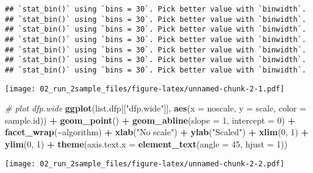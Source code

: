 \documentclass[
]{article}
\newenvironment{Shaded}{\begin{snugshade}}{\end{snugshade}}
\newcommand{\AttributeTok}[1]{\textcolor[rgb]{0.13,0.29,0.53}{#1}}
\newcommand{\CommentTok}[1]{\textcolor[rgb]{0.56,0.35,0.01}{\textit{#1}}}
\newcommand{\DecValTok}[1]{\textcolor[rgb]{0.00,0.00,0.81}{#1}}
\newcommand{\FunctionTok}[1]{\textcolor[rgb]{0.13,0.29,0.53}{\textbf{#1}}}
\newcommand{\NormalTok}[1]{#1}
\newcommand{\SpecialCharTok}[1]{\textcolor[rgb]{0.81,0.36,0.00}{\textbf{#1}}}
\newcommand{\StringTok}[1]{\textcolor[rgb]{0.31,0.60,0.02}{#1}}
\begin{document}
\begin{verbatim}
## `stat_bin()` using `bins = 30`. Pick better value with `binwidth`.
## `stat_bin()` using `bins = 30`. Pick better value with `binwidth`.
## `stat_bin()` using `bins = 30`. Pick better value with `binwidth`.
## `stat_bin()` using `bins = 30`. Pick better value with `binwidth`.
## `stat_bin()` using `bins = 30`. Pick better value with `binwidth`.
## `stat_bin()` using `bins = 30`. Pick better value with `binwidth`.
## `stat_bin()` using `bins = 30`. Pick better value with `binwidth`.
\end{verbatim}

\texttt{[image: 02\_run\_2sample\_files/figure-latex/unnamed-chunk-2-1.pdf]}

\begin{Shaded}
\begin{Highlighting}[]
\CommentTok{\# plot dfp.wide}
\FunctionTok{ggplot}\NormalTok{(list.dfp[[}\StringTok{"dfp.wide"}\NormalTok{]], }\FunctionTok{aes}\NormalTok{(}\AttributeTok{x =}\NormalTok{ noscale, }\AttributeTok{y =}\NormalTok{ scale, }\AttributeTok{color =}\NormalTok{ sample.id)) }\SpecialCharTok{+} \FunctionTok{geom\_point}\NormalTok{() }\SpecialCharTok{+} 
  \FunctionTok{geom\_abline}\NormalTok{(}\AttributeTok{slope =} \DecValTok{1}\NormalTok{, }\AttributeTok{intercept =} \DecValTok{0}\NormalTok{) }\SpecialCharTok{+} \FunctionTok{facet\_wrap}\NormalTok{(}\SpecialCharTok{\textasciitilde{}}\NormalTok{algorithm) }\SpecialCharTok{+}
  \FunctionTok{xlab}\NormalTok{(}\StringTok{"No scale"}\NormalTok{) }\SpecialCharTok{+} \FunctionTok{ylab}\NormalTok{(}\StringTok{"Scaled"}\NormalTok{) }\SpecialCharTok{+} \FunctionTok{xlim}\NormalTok{(}\DecValTok{0}\NormalTok{, }\DecValTok{1}\NormalTok{) }\SpecialCharTok{+} \FunctionTok{ylim}\NormalTok{(}\DecValTok{0}\NormalTok{, }\DecValTok{1}\NormalTok{) }\SpecialCharTok{+}
  \FunctionTok{theme}\NormalTok{(}\AttributeTok{axis.text.x =} \FunctionTok{element\_text}\NormalTok{(}\AttributeTok{angle =} \DecValTok{45}\NormalTok{, }\AttributeTok{hjust =} \DecValTok{1}\NormalTok{))}
\end{Highlighting}
\end{Shaded}

\texttt{[image: 02\_run\_2sample\_files/figure-latex/unnamed-chunk-2-2.pdf]}
\end{document}
